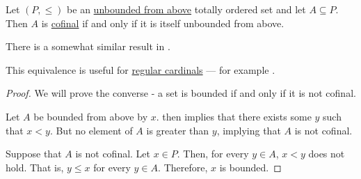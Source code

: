 \begin{proposition}\label{thm:totally_ordered_cofinal_equivalences}
  Let \( (P, \leq) \) be an \hyperref[def:extremal_points/upper_and_lower_bounds]{unbounded from above} totally ordered set and let \( A \subseteq P \). Then \( A \) is \hyperref[def:cofinal_set]{cofinal} if and only if it is itself unbounded from above.
\end{proposition}
\begin{comments}
  \item There is a somewhat similar result in .
  \item This equivalence is useful for \hyperref[def:regular_cardinal]{regular cardinals} --- for example .
\end{comments}
\begin{proof}
  We will prove the converse - a set is bounded if and only if it is not cofinal.

  \SufficiencySubProof Let \( A \) be bounded from above by \( x \).  then implies that there exists some \( y \) such that \( x < y \). But no element of \( A \) is greater than \( y \), implying that \( A \) is not cofinal.

  \NecessitySubProof Suppose that \( A \) is not cofinal. Let \( x \in P \). Then, for every \( y \in A \), \( x < y \) does not hold. That is, \( y \leq x \) for every \( y \in A \). Therefore, \( x \) is bounded.
\end{proof}

